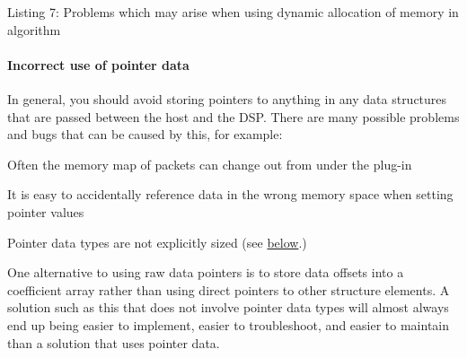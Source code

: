\begin{DoxyCode}{0}
\DoxyCodeLine{\textcolor{comment}{// blocks are not aligned to 8-byte boundaries by default. This prevents double-word}}
\DoxyCodeLine{\textcolor{comment}{// memory access optimizations from working}}
\DoxyCodeLine{}
\DoxyCodeLine{\textcolor{comment}{// Though AAX\_Alignment.h does include some aligned memory allocators to counteract the alignment}}
\DoxyCodeLine{\textcolor{comment}{// problem, their use is still strongly discouraged.}}
\end{DoxyCode}
  Listing 7\+: Problems which may arise when using dynamic allocation of memory in algorithm

\hypertarget{a00832_subsubsection__incorrect_use_of_pointer_data}{}\paragraph{Incorrect use of pointer data}\label{a00832_subsubsection__incorrect_use_of_pointer_data}
In general, you should avoid storing pointers to anything in any data structures that are passed between the host and the D\+SP. There are many possible problems and bugs that can be caused by this, for example\+:


\begin{DoxyItemize}
\item Often the memory map of packets can change out from under the plug-\/in  
\item It is easy to accidentally reference data in the wrong memory space when setting pointer values  
\item Pointer data types are not explicitly sized (see \mbox{\hyperlink{a00832_subsubsection__pointer_data_size_incompatibility}{below}}.)  
\end{DoxyItemize}

One alternative to using raw data pointers is to store data offsets into a coefficient array rather than using direct pointers to other structure elements. A solution such as this that does not involve pointer data types will almost always end up being easier to implement, easier to troubleshoot, and easier to maintain than a solution that uses pointer data.

